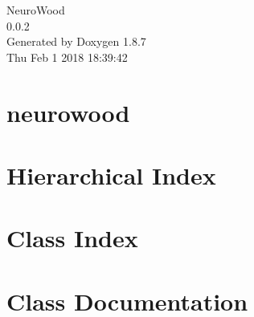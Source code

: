 \documentclass[twoside]{book}
\newcommand{\+}{\discretionary{\mbox{\scriptsize$\hookleftarrow$}}{}{}}
\newcommand{\clearemptydoublepage}{%
  \newpage{\pagestyle{empty}\cleardoublepage}%
}
\begin{document}
\hypersetup{pageanchor=false,
             bookmarks=true,
             bookmarksnumbered=true,
             pdfencoding=unicode
            }
\begin{titlepage}
\vspace*{7cm}
\begin{center}%
{\Large Neuro\+Wood \\[1ex]\large 0.\+0.\+2 }\\
\vspace*{1cm}
{\large Generated by Doxygen 1.8.7}\\
\vspace*{0.5cm}
{\small Thu Feb 1 2018 18:39:42}\\
\end{center}
\end{titlepage}
\clearemptydoublepage
\tableofcontents
\clearemptydoublepage
{}
\hypersetup{pageanchor=true}

\chapter{neurowood}
\label{md__r_e_a_d_m_e}
\hypertarget{md__r_e_a_d_m_e}{}

\chapter{Hierarchical Index}

\chapter{Class Index}

\chapter{Class Documentation}

























\newpage
{}
{}
\printindex
\end{document}
